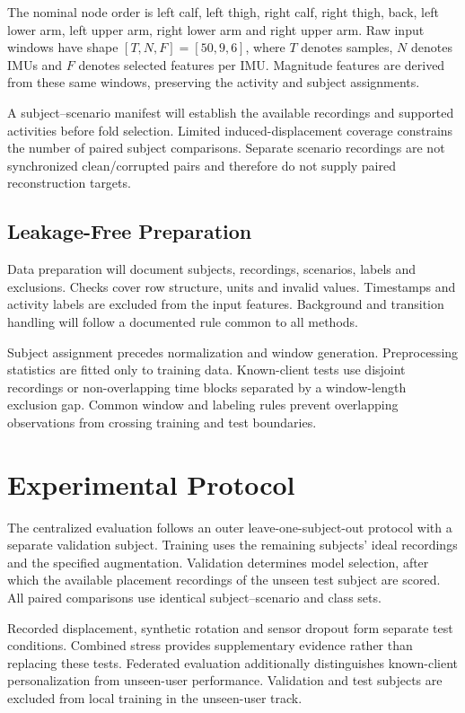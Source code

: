 \documentclass[10pt,a4paper,oneside,openany]{report}
\begin{document}
The nominal node order is left calf, left thigh, right calf, right thigh, back, left lower arm, left upper arm, right lower arm and right upper arm. Raw input windows have shape $[T,N,F]=[50,9,6]$, where $T$ denotes samples, $N$ denotes IMUs and $F$ denotes selected features per IMU. Magnitude features are derived from these same windows, preserving the activity and subject assignments.

A subject--scenario manifest will establish the available recordings and supported activities before fold selection. Limited induced-displacement coverage constrains the number of paired subject comparisons. Separate scenario recordings are not synchronized clean/corrupted pairs and therefore do not supply paired reconstruction targets.

\subsection{Leakage-Free Preparation}

Data preparation will document subjects, recordings, scenarios, labels and exclusions. Checks cover row structure, units and invalid values. Timestamps and activity labels are excluded from the input features. Background and transition handling will follow a documented rule common to all methods.

Subject assignment precedes normalization and window generation. Preprocessing statistics are fitted only to training data. Known-client tests use disjoint recordings or non-overlapping time blocks separated by a window-length exclusion gap. Common window and labeling rules prevent overlapping observations from crossing training and test boundaries.

\section{Experimental Protocol}

The centralized evaluation follows an outer leave-one-subject-out protocol with a separate validation subject. Training uses the remaining subjects' ideal recordings and the specified augmentation. Validation determines model selection, after which the available placement recordings of the unseen test subject are scored. All paired comparisons use identical subject--scenario and class sets.

Recorded displacement, synthetic rotation and sensor dropout form separate test conditions. Combined stress provides supplementary evidence rather than replacing these tests. Federated evaluation additionally distinguishes known-client personalization from unseen-user performance. Validation and test subjects are excluded from local training in the unseen-user track.
\end{document}
